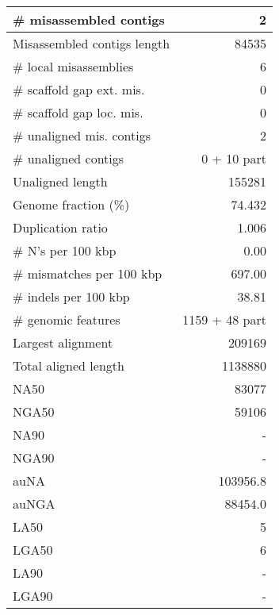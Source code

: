 \documentclass[12pt,a4paper]{article}
\begin{document}
\begin{table}[ht]
\begin{center}
\begin{tabular}{|l*{1}{|r}|}
\# misassembled contigs & 2 \\ \hline
Misassembled contigs length & 84535 \\ \hline
\# local misassemblies & 6 \\ \hline
\# scaffold gap ext. mis. & 0 \\ \hline
\# scaffold gap loc. mis. & 0 \\ \hline
\# unaligned mis. contigs & 2 \\ \hline
\# unaligned contigs & 0 + 10 part \\ \hline
Unaligned length & 155281 \\ \hline
Genome fraction (\%) & 74.432 \\ \hline
Duplication ratio & 1.006 \\ \hline
\# N's per 100 kbp & 0.00 \\ \hline
\# mismatches per 100 kbp & 697.00 \\ \hline
\# indels per 100 kbp & 38.81 \\ \hline
\# genomic features & 1159 + 48 part \\ \hline
Largest alignment & 209169 \\ \hline
Total aligned length & 1138880 \\ \hline
NA50 & 83077 \\ \hline
NGA50 & 59106 \\ \hline
NA90 & - \\ \hline
NGA90 & - \\ \hline
auNA & 103956.8 \\ \hline
auNGA & 88454.0 \\ \hline
LA50 & 5 \\ \hline
LGA50 & 6 \\ \hline
LA90 & - \\ \hline
LGA90 & - \\ \hline
\end{tabular}
\end{center}
\end{table}
\end{document}
